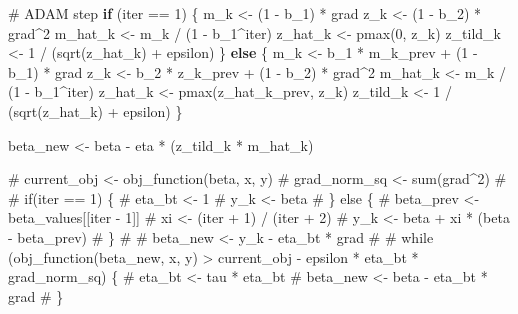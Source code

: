 \documentclass[
  letterpaper,
  DIV=11,
  numbers=noendperiod]{scrartcl}
\newenvironment{Shaded}{\begin{snugshade}}{\end{snugshade}}
\newcommand{\CommentTok}[1]{\textcolor[rgb]{0.37,0.37,0.37}{#1}}
\newcommand{\ControlFlowTok}[1]{\textcolor[rgb]{0.00,0.23,0.31}{\textbf{#1}}}
\newcommand{\DecValTok}[1]{\textcolor[rgb]{0.68,0.00,0.00}{#1}}
\newcommand{\FunctionTok}[1]{\textcolor[rgb]{0.28,0.35,0.67}{#1}}
\newcommand{\NormalTok}[1]{\textcolor[rgb]{0.00,0.23,0.31}{#1}}
\newcommand{\OtherTok}[1]{\textcolor[rgb]{0.00,0.23,0.31}{#1}}
\newcommand{\SpecialCharTok}[1]{\textcolor[rgb]{0.37,0.37,0.37}{#1}}
\begin{document}
\begin{Shaded}
\begin{Highlighting}[]
    \CommentTok{\# ADAM step}
    \ControlFlowTok{if}\NormalTok{ (iter }\SpecialCharTok{==} \DecValTok{1}\NormalTok{) \{}
\NormalTok{      m\_k }\OtherTok{\textless{}{-}}\NormalTok{ (}\DecValTok{1} \SpecialCharTok{{-}}\NormalTok{ b\_1) }\SpecialCharTok{*}\NormalTok{ grad}
\NormalTok{      z\_k }\OtherTok{\textless{}{-}}\NormalTok{ (}\DecValTok{1} \SpecialCharTok{{-}}\NormalTok{ b\_2) }\SpecialCharTok{*}\NormalTok{ grad}\SpecialCharTok{\^{}}\DecValTok{2}
\NormalTok{      m\_hat\_k }\OtherTok{\textless{}{-}}\NormalTok{ m\_k }\SpecialCharTok{/}\NormalTok{ (}\DecValTok{1} \SpecialCharTok{{-}}\NormalTok{ b\_1}\SpecialCharTok{\^{}}\NormalTok{iter)}
\NormalTok{      z\_hat\_k }\OtherTok{\textless{}{-}} \FunctionTok{pmax}\NormalTok{(}\DecValTok{0}\NormalTok{, z\_k)}
\NormalTok{      z\_tild\_k }\OtherTok{\textless{}{-}} \DecValTok{1} \SpecialCharTok{/}\NormalTok{ (}\FunctionTok{sqrt}\NormalTok{(z\_hat\_k) }\SpecialCharTok{+}\NormalTok{ epsilon)}
\NormalTok{    \} }\ControlFlowTok{else}\NormalTok{ \{}
\NormalTok{      m\_k }\OtherTok{\textless{}{-}}\NormalTok{ b\_1 }\SpecialCharTok{*}\NormalTok{ m\_k\_prev }\SpecialCharTok{+}\NormalTok{ (}\DecValTok{1} \SpecialCharTok{{-}}\NormalTok{ b\_1) }\SpecialCharTok{*}\NormalTok{ grad}
\NormalTok{      z\_k }\OtherTok{\textless{}{-}}\NormalTok{ b\_2 }\SpecialCharTok{*}\NormalTok{ z\_k\_prev }\SpecialCharTok{+}\NormalTok{ (}\DecValTok{1} \SpecialCharTok{{-}}\NormalTok{ b\_2) }\SpecialCharTok{*}\NormalTok{ grad}\SpecialCharTok{\^{}}\DecValTok{2}
\NormalTok{      m\_hat\_k }\OtherTok{\textless{}{-}}\NormalTok{ m\_k }\SpecialCharTok{/}\NormalTok{ (}\DecValTok{1} \SpecialCharTok{{-}}\NormalTok{ b\_1}\SpecialCharTok{\^{}}\NormalTok{iter)}
\NormalTok{      z\_hat\_k }\OtherTok{\textless{}{-}} \FunctionTok{pmax}\NormalTok{(z\_hat\_k\_prev, z\_k)}
\NormalTok{      z\_tild\_k }\OtherTok{\textless{}{-}} \DecValTok{1} \SpecialCharTok{/}\NormalTok{ (}\FunctionTok{sqrt}\NormalTok{(z\_hat\_k) }\SpecialCharTok{+}\NormalTok{ epsilon)}
\NormalTok{    \}}
    
\NormalTok{    beta\_new }\OtherTok{\textless{}{-}}\NormalTok{ beta }\SpecialCharTok{{-}}\NormalTok{ eta }\SpecialCharTok{*}\NormalTok{ (z\_tild\_k }\SpecialCharTok{*}\NormalTok{ m\_hat\_k)}

    \CommentTok{\# current\_obj \textless{}{-} obj\_function(beta, x, y)}
    \CommentTok{\# grad\_norm\_sq \textless{}{-} sum(grad\^{}2)}
    \CommentTok{\# }
    \CommentTok{\# if(iter == 1) \{}
    \CommentTok{\#   eta\_bt \textless{}{-} 1}
    \CommentTok{\#   y\_k \textless{}{-} beta}
    \CommentTok{\# \} else \{}
    \CommentTok{\#   beta\_prev \textless{}{-} beta\_values[[iter {-} 1]]}
    \CommentTok{\#   xi \textless{}{-} (iter + 1) / (iter + 2)}
    \CommentTok{\#   y\_k \textless{}{-} beta + xi * (beta {-} beta\_prev)}
    \CommentTok{\# \}}
    \CommentTok{\# }
    \CommentTok{\# beta\_new \textless{}{-} y\_k {-} eta\_bt * grad}
    \CommentTok{\# }
    \CommentTok{\# while (obj\_function(beta\_new, x, y) \textgreater{} current\_obj {-} epsilon * eta\_bt * grad\_norm\_sq) \{}
    \CommentTok{\#   eta\_bt \textless{}{-} tau * eta\_bt}
    \CommentTok{\#   beta\_new \textless{}{-} beta {-} eta\_bt * grad}
    \CommentTok{\# \}}
    

\end{Highlighting}
\end{Shaded}
\end{document}
